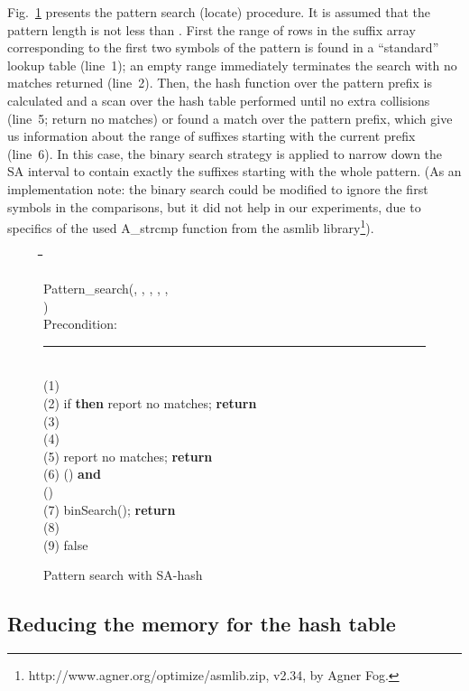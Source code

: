 \documentclass{cai}
\newcommand{\uif}{{\bf if}\xspace}
\newcommand{\uthen}{{\bf then}\xspace}
\newcommand{\urepeat}{{\bf repeat}\xspace}
\newcommand{\uuntil}{{\bf until}\xspace}
\newcommand{\ureturn}{{\bf return}\xspace}
\newcounter{lineno}
\newcommand{\utab}{\qquad}
\newcommand{\startindent}{\hspace{0.8em}}
\newenvironment{code}{\setcounter{lineno}{0}\begin{tabbing}
\utab\=\utab\=\utab\=\utab\=\utab\=\utab\=\utab\=\utab\=\utab\=\utab\=\utab\=\utab\=\utab\= \kill
}
{
\end{tabbing}\vspace{-2mm}
}
\begin{document}
Fig.~\ref{fig:Pattern_search} presents the pattern search (locate) procedure.
It is assumed that the pattern length  is not less than .
First the range of rows in the suffix array corresponding to the first two 
symbols of the pattern is found in a ``standard'' lookup table (line~1); 
an empty range immediately terminates the search with no matches returned (line~2).
Then, the hash function over the pattern prefix is calculated and a scan over the 
hash table performed until no extra collisions (line~5; return no matches) 
or found a match over the pattern prefix, which give us information about the range 
of suffixes starting with the current prefix (line~6).
In this case, the binary search strategy is applied to narrow down the SA interval 
to contain exactly the suffixes starting with the whole pattern.
(As an implementation note: the binary search could be modified to ignore the first  
symbols in the comparisons, but it did not help in our experiments, 
due to specifics of the used A\_strcmp function from the asmlib library\footnote{http://www.agner.org/optimize/asmlib.zip, v2.34, by Agner Fog.}).


\begin{figure}
\begin{small}
\begin{code}
Pattern\_search(, , , , , \\
\>\>\>) \\
Precondition:  \\
\rule{\textwidth}{0.3mm} \\
(1) \startindent  \\
(2) \startindent if  \uthen report no matches; \ureturn \\
(3) \startindent  \\
(4) \startindent \urepeat \\
(5) \startindent \>\>\uif  \uthen report no matches; \ureturn \\
(6) \startindent \>\>\uif () \textbf{and} \\
\>\>\>() \\
(7) \startindent \>\>\>\uthen binSearch(); \ureturn \\
(8) \startindent \>\> \\
(9) \startindent \uuntil false \\
\end{code}
\caption{Pattern search with SA-hash}
\label{fig:Pattern_search}
\end{small}
\end{figure}


\subsection{Reducing the memory for the hash table}
\end{document}

